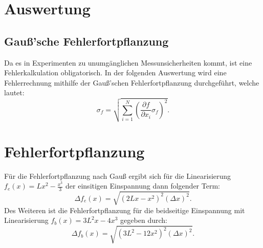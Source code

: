 \section{Auswertung}
\label{sec:Auswertung}

\subsection{Gauß'sche Fehlerfortpflanzung}
Da es in Experimenten zu unumgänglichen Messunsicherheiten kommt, ist eine 
Fehlerkalkulation obligatorisch. In der folgenden Auswertung wird eine 
Fehlerrechnung mithilfe der Gauß'schen Fehlerfortpflanzung durchgeführt, welche
lautet:
\begin{equation}
    \sigma_f = \sqrt{\sum\limits_{i=1}^N \left( \frac{\partial f}{\partial x_i} \sigma_f \right) ^2}.
\end{equation}

\section{Fehlerfortpflanzung}
Für die Fehlerfortpflanzung nach Gauß ergibt sich für die Linearisierung
$f_e(x)=Lx^2-\frac{x^3}{3}$ der einsitigen Einspannung dann folgender Term:
\begin{equation}
  \Delta f_e(x) = \sqrt{(2Lx-x^2)^2 (\Delta x)^2}.
\end{equation}
Des Weiteren ist die Fehlerfortpflanzung für die beidseitige Einspannung 
mit Linearisierung $f_b(x)=3L^2x-4x^3$ gegeben durch:
\begin{equation}
  \Delta f_b(x) = \sqrt{(3L^2-12x^2)^2 (\Delta x)^2}.
\end{equation}



